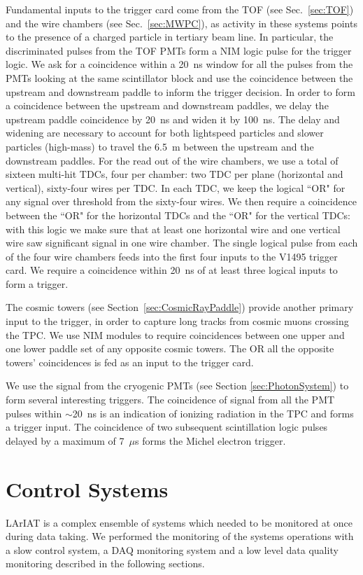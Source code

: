 Fundamental inputs to the trigger card come from the TOF (see Sec.~\ref{sec:TOF}) and the wire chambers (see Sec.~\ref{sec:MWPC}), as activity in these systems points to the presence of a charged particle in tertiary beam line.
In particular, the discriminated pulses from the TOF PMTs form a NIM logic pulse for the trigger logic. We ask for a coincidence within a 20~ns window for all the pulses from the PMTs looking at the same scintillator block and use the coincidence between the upstream and downstream paddle to inform the trigger decision. In order to form a coincidence between the upstream and downstream paddles, we delay the upstream paddle coincidence by 20~ns and widen it by 100~ns. The delay and widening are necessary to account for both  lightspeed particles and slower particles (high-mass) to travel the 6.5~m between the upstream and the downstream paddles. 
For the read out of the wire chambers, we use a total of sixteen multi-hit TDCs, four per chamber: two TDC per plane (horizontal and vertical), sixty-four wires per TDC. In each TDC, we keep the logical ``OR" for any signal over threshold from the sixty-four wires. We then require a coincidence between the ``OR" for the horizontal TDCs and the ``OR" for the vertical TDCs: with this logic we make sure that at least one horizontal wire and one vertical wire saw significant signal in one wire chamber.  The single logical pulse from each of the four wire chambers feeds into the first four inputs to the V1495 trigger card. We require a coincidence within 20~ns of at least three logical inputs to form a trigger.


The cosmic towers (see Section~\ref{sec:CosmicRayPaddle}) provide another primary input to the trigger, in order to capture long tracks from cosmic muons crossing the TPC. We use NIM modules to require coincidences between one upper and one lower paddle set of any opposite cosmic towers. The OR all the opposite towers' coincidences is fed as an input to the trigger card. 

We use the signal from the cryogenic PMTs (see Section \ref{sec:PhotonSystem}) to form several interesting triggers. The coincidence of signal from all the PMT pulses within $\sim$20~ns is an indication of ionizing radiation in the TPC and forms a trigger input.  The coincidence of two subsequent scintillation logic pulses delayed by a maximum of  7~$\mu$s forms the Michel electron trigger. 




\section{Control Systems}
LArIAT is a complex ensemble of systems which needed to be monitored at once during data taking.  We performed the monitoring of the systems operations with a slow control system, a DAQ monitoring system and a low level data quality monitoring described in the following sections.

